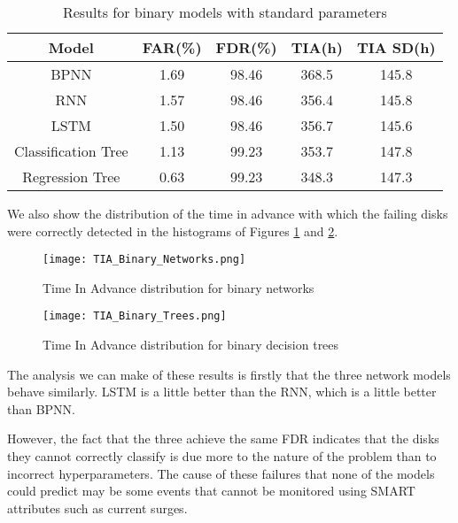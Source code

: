 \begin{table}
  \begin{center}
    \begin{tabular}{|c|c|c|c|c|}
      \hline
    Model & FAR(\%) & FDR(\%) & TIA(h) & TIA SD(h) \\
    \hline
    BPNN & 1.69 & 98.46 & 368.5 & 145.8 \\
    RNN & 1.57 & 98.46 & 356.4 & 145.8 \\
    LSTM & 1.50 & 98.46 & 356.7 & 145.6 \\
    Classification Tree & 1.13 & 99.23 & 353.7 & 147.8 \\
    Regression Tree & 0.63 & 99.23 & 348.3 & 147.3 \\
    \hline
    \end{tabular}
    \caption[Results Binary Models]{Results for binary models with standard parameters}
    \label{table:results_binary}
  \end{center}
\end{table}

We also show the distribution of the time in advance with which the failing disks were correctly detected in the histograms of Figures \ref{fig:tia_binary_network} and \ref{fig:tia_binary_tree}.

\begin{figure}
\begin{center}
  \texttt{[image: TIA\_Binary\_Networks.png]}
  \caption[TIA for binary networks]{Time In Advance distribution for binary networks}
  \label{fig:tia_binary_network}
\end{center}
\end{figure}

\begin{figure}
\begin{center}
  \texttt{[image: TIA\_Binary\_Trees.png]}
  \caption[TIA for binary decision trees]{Time In Advance distribution for binary decision trees}
  \label{fig:tia_binary_tree}
\end{center}
\end{figure}

The analysis we can make of these results is firstly that the three network models behave similarly.
LSTM is a little better than the RNN, which is a little better than BPNN.

However, the fact that the three achieve the same FDR indicates that the disks they cannot correctly classify is due more to the nature of the problem than to incorrect hyperparameters.
The cause of these failures that none of the models could predict may be some events that cannot be monitored using SMART attributes such as current surges.

